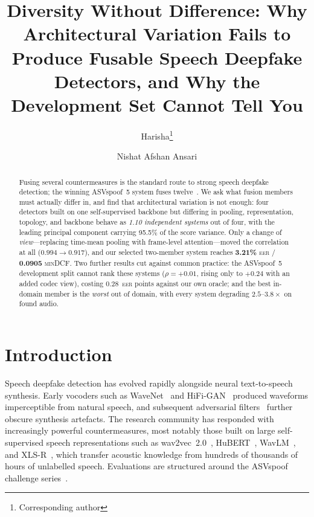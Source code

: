\documentclass{llncs}
\title{Diversity Without Difference: Why Architectural Variation Fails
to Produce Fusable Speech Deepfake Detectors, and Why the Development
Set Cannot Tell You}
\author{Harisha\inst{1}\thanks{Corresponding author} \and Nishat Afshan Ansari\inst{1}}
\institute{Department of Computer Science and Engineering,\\
Indian Institute of Information Technology, Nagpur, India\\
\email{iiitnharisha@gmail.com, nishat.ansari@iiitn.ac.in}}
\newcommand{\eer}{\textsc{eer}}
\newcommand{\mindcf}{\textsc{minDCF}}
\newcommand{\best}[1]{\textbf{#1}}
\begin{document}
\maketitle

\begin{abstract}
Fusing several countermeasures is the standard route to strong speech deepfake
detection; the winning ASVspoof~5 system fuses twelve~\cite{ustc2024}.
We ask what fusion members must actually differ in, and find that architectural
variation is not enough: four detectors built on one self-supervised backbone but
differing in pooling, representation, topology, and backbone behave as
\emph{1.10 independent systems} out of four, with the leading principal component
carrying 95.5\% of the score variance.
Only a change of \emph{view}---replacing time-mean pooling with frame-level
attention---moved the correlation at all ($0.994\!\rightarrow\!0.917$), and our
selected two-member system reaches \best{3.21\%} \eer{} / \best{0.0905} \mindcf{}.
Two further results cut against common practice: the ASVspoof~5 development split
cannot rank these systems ($\rho{=}+0.01$, rising only to $+0.24$ with an added
codec view), costing 0.28~\eer{} points against our own oracle; and the best
in-domain member is the \emph{worst} out of domain, with every system degrading
$2.5$--$3.8\times$ on found audio.

\end{abstract}

\section{Introduction}
\label{sec:intro}

Speech deepfake detection has evolved rapidly alongside neural text-to-speech
synthesis.  Early vocoders such as WaveNet~\cite{wavenet} and HiFi-GAN~\cite{hifigan}
produced waveforms imperceptible from natural speech, and subsequent adversarial
filters~\cite{malafide,malacopula} further obscure synthesis artefacts.  The
research community has responded with increasingly powerful countermeasures, most
notably those built on large self-supervised speech representations such as
wav2vec~2.0~\cite{wav2vec2}, HuBERT~\cite{hubert}, WavLM~\cite{wavlm}, and
XLS-R~\cite{xlsr}, which transfer acoustic knowledge from hundreds of thousands
of hours of unlabelled speech.  Evaluations are structured around the ASVspoof
challenge series~\cite{asvspoof2019,asvspoof2021,liu2023asvspoof,asvspoof5}.
\end{document}
